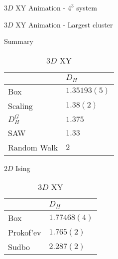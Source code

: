 \documentclass[10pt]{beamer}
\begin{document}
\begin{frame}{$3D$ XY Animation - $4^3$ system}
\end{frame}

\begin{frame}{$3D$ XY Animation - Largest cluster}
\end{frame}

\begin{frame}{Summary}
    \begin{table}
        \parbox{.45\linewidth}{
            \centering
            \begin{tabular}{l|l}
                               & $D_H$          \\ \hline
                Box            & $1.35193(5)$   \\ \hline
                Scaling        & $1.38(2)$      \\ \hline
                $D_H^G$        & $1.375$        \\ \hline
                SAW            & $1.33$         \\ \hline
                Random Walk    & $2$                          
            \end{tabular}
            \caption{$2D$ Ising}
        }
        \hfill
        \parbox{.45\linewidth}{
            \centering
            \begin{tabular}{l|l}
                            & $D_H$           \\ \hline
                Box         & $1.77468(4)$    \\ \hline
                Prokof'ev   & $1.765(2)$      \\ \hline
                Sudbo       & $2.287(2)$  
            \end{tabular}
            \caption{$3D$ XY}
        }
    \end{table}
\end{frame}
\end{document}
